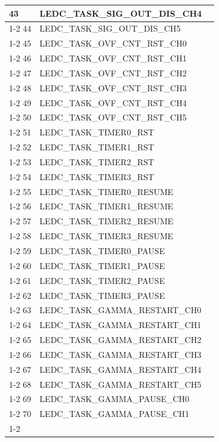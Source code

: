 \documentclass[main\_\_EN.tex]{subfiles}
\begin{document}
\begin{longtable}{ | l | l | l | }
43  & LEDC\_TASK\_SIG\_OUT\_DIS\_CH4& \\ \cline{1-2}
44  & LEDC\_TASK\_SIG\_OUT\_DIS\_CH5& \\ \cline{1-2}
45  & LEDC\_TASK\_OVF\_CNT\_RST\_CH0& \\ \cline{1-2}
46  & LEDC\_TASK\_OVF\_CNT\_RST\_CH1& \\ \cline{1-2}
47  & LEDC\_TASK\_OVF\_CNT\_RST\_CH2& \\ \cline{1-2}
48  & LEDC\_TASK\_OVF\_CNT\_RST\_CH3& \\ \cline{1-2}
49  & LEDC\_TASK\_OVF\_CNT\_RST\_CH4& \\ \cline{1-2}
50  & LEDC\_TASK\_OVF\_CNT\_RST\_CH5& \\ \cline{1-2}
51  & LEDC\_TASK\_TIMER0\_RST  & \\ \cline{1-2}
52  & LEDC\_TASK\_TIMER1\_RST  & \\ \cline{1-2}
53  & LEDC\_TASK\_TIMER2\_RST  & \\ \cline{1-2}
54  & LEDC\_TASK\_TIMER3\_RST  & \\ \cline{1-2}
55  & LEDC\_TASK\_TIMER0\_RESUME    & \\ \cline{1-2}
56  & LEDC\_TASK\_TIMER1\_RESUME    & \\ \cline{1-2}
57  & LEDC\_TASK\_TIMER2\_RESUME    & \\ \cline{1-2}
58  & LEDC\_TASK\_TIMER3\_RESUME    & \\ \cline{1-2}
59  & LEDC\_TASK\_TIMER0\_PAUSE& \\ \cline{1-2}
60  & LEDC\_TASK\_TIMER1\_PAUSE& \\ \cline{1-2}
61  & LEDC\_TASK\_TIMER2\_PAUSE& \\ \cline{1-2}
62  & LEDC\_TASK\_TIMER3\_PAUSE& \\ \cline{1-2}
63  & LEDC\_TASK\_GAMMA\_RESTART\_CH0      & \\ \cline{1-2}
64  & LEDC\_TASK\_GAMMA\_RESTART\_CH1      & \\ \cline{1-2}
65  & LEDC\_TASK\_GAMMA\_RESTART\_CH2      & \\ \cline{1-2}
66  & LEDC\_TASK\_GAMMA\_RESTART\_CH3      & \\ \cline{1-2}
67  & LEDC\_TASK\_GAMMA\_RESTART\_CH4      & \\ \cline{1-2}
68  & LEDC\_TASK\_GAMMA\_RESTART\_CH5      & \\ \cline{1-2}
69  & LEDC\_TASK\_GAMMA\_PAUSE\_CH0 & \\ \cline{1-2}
70  & LEDC\_TASK\_GAMMA\_PAUSE\_CH1 & \\ \cline{1-2}

\end{longtable}
\end{document}
